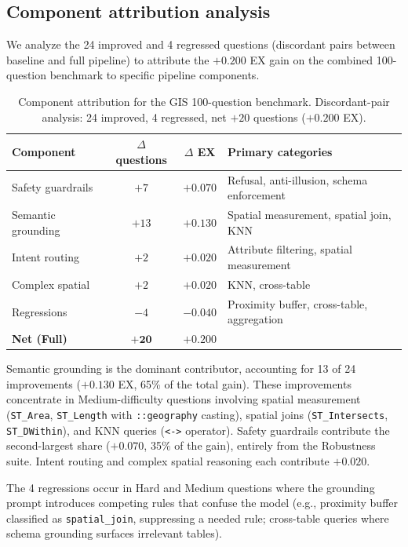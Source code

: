 \documentclass[11pt]{article}
\begin{document}
\subsection{Component attribution analysis}
\label{sec:ablation}

We analyze the 24 improved and 4 regressed questions (discordant pairs between baseline and full pipeline) to attribute the $+0.200$ EX gain on the combined 100-question benchmark to specific pipeline components.

\begin{table}[t]
\centering
\caption{Component attribution for the GIS 100-question benchmark. Discordant-pair analysis: 24 improved, 4 regressed, net $+20$ questions ($+0.200$ EX).}
\label{tab:ablation}
\begin{tabular}{lccl}
\toprule
Component & $\Delta$ questions & $\Delta$ EX & Primary categories \\
\midrule
Safety guardrails & $+7$ & $+0.070$ & Refusal, anti-illusion, schema enforcement \\
Semantic grounding & $+13$ & $+0.130$ & Spatial measurement, spatial join, KNN \\
Intent routing & $+2$ & $+0.020$ & Attribute filtering, spatial measurement \\
Complex spatial & $+2$ & $+0.020$ & KNN, cross-table \\
Regressions & $-4$ & $-0.040$ & Proximity buffer, cross-table, aggregation \\
\midrule
\textbf{Net (Full)} & $\mathbf{+20}$ & $\mathbf{+0.200}$ & \\
\bottomrule
\end{tabular}
\end{table}

Semantic grounding is the dominant contributor, accounting for 13 of 24 improvements ($+0.130$ EX, 65\% of the total gain). These improvements concentrate in Medium-difficulty questions involving spatial measurement (\texttt{ST\_Area}, \texttt{ST\_Length} with \texttt{::geography} casting), spatial joins (\texttt{ST\_Intersects}, \texttt{ST\_DWithin}), and KNN queries (\texttt{<->} operator). Safety guardrails contribute the second-largest share ($+0.070$, 35\% of the gain), entirely from the Robustness suite. Intent routing and complex spatial reasoning each contribute $+0.020$.

The 4 regressions occur in Hard and Medium questions where the grounding prompt introduces competing rules that confuse the model (e.g., proximity buffer classified as \texttt{spatial\_join}, suppressing a needed rule; cross-table queries where schema grounding surfaces irrelevant tables).
\end{document}
